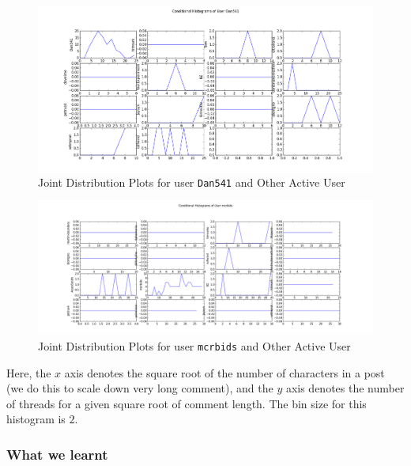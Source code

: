 \documentclass[a4paper,12pt]{article}
\numberwithin{equation}{section}
\begin{document}
\begin{figure}[here!]
\begin{center}
\includegraphics[scale=0.46, angle = 90]{Dan541.png}
\caption{Joint Distribution Plots for user {\tt Dan541} and Other Active User}
\end{center}
\end{figure}

\begin{figure}[here!]
\begin{center}
\includegraphics[angle = 90, scale=0.46]{mcrbids.png}
\caption{Joint Distribution Plots for user {\tt mcrbids} and Other Active User}
\end{center}
\end{figure}

Here, the $x$ axis denotes the square root of the number of characters in a post (we do this to scale down very long comment), and the $y$ axis denotes the number of threads for a given square root of comment length. The bin size for this histogram is $2$.


\subsubsection*{What we learnt}

\end{document}
